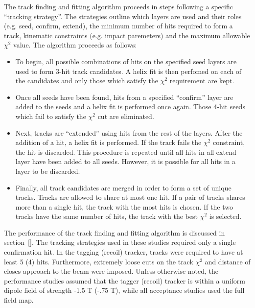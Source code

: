 The track finding and fitting algorithm proceeds in steps following a specific 
``tracking strategy''.  The strategies outline which layers are used and their
roles (e.g. seed, confirm, extend), 
the minimum number of hits required to form a track, kinematic constraints
(e.g. impact paremeters) and the maximum allowable $\chi^2$ value. The algorithm
proceeds as follows:
\begin{itemize}
    \item To begin, all possible combinations of hits on the specified seed 
          layers are used to form 3-hit track candidates.  A helix fit is then 
          perfomed on each of the candidates and only those which satisfy the
          $\chi^2$ requirement are kept.
    \item Once all seeds have been found, hits from a specified ``confirm'' 
          layer are added to the seeds and a helix fit is performed once again.
          Those 4-hit seeds which fail to satisfy the $\chi^2$ cut are eliminated.
    \item Next, tracks are ``extended'' using hits from the rest of the layers.
          After the addition of a hit, a helix fit is performed.  If the track
          fails the $\chi^2$ constraint, the hit is discarded.  This procedure
          is repeated until all hits in all extend layer have been added to all seeds. 
          However, it is possible for all hits in a layer to be discarded.
    \item Finally, all track candidates are merged in order to form a set of unique 
          tracks.  Tracks are allowed to share at most one hit.  If a pair of
          tracks shares more than a single hit, the track with the most hits is
          chosen.  If the two tracks have the same number of hits, the track 
          with the best $\chi^2$  is selected.
\end{itemize}

The performance of the track finding and fitting algorithm is discussed in 
section~\ref{}.  The tracking strategies used in these studies required only 
a single confirmation hit.  In the tagging (recoil) tracker, tracks were 
required to have at least 5 (4) hits. Furthermore, extremely loose cuts on the
track $\chi^2$ and distance of closes approach to the beam were imposed. 
Unless otherwise noted, the performance studies assumed that the 
tagger (recoil) tracker is within a uniform dipole field of strength -1.5 T 
(-.75 T), while all acceptance studies used the full field map.
